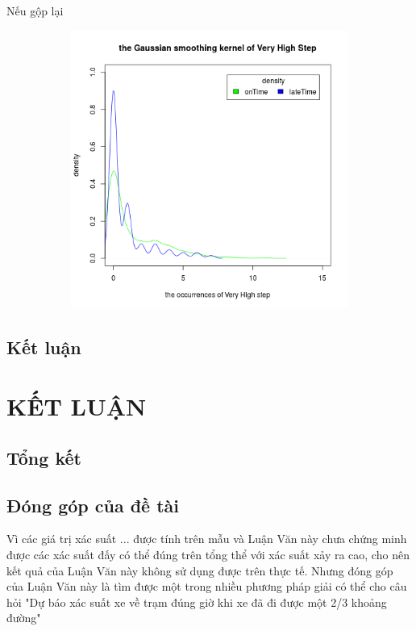 \documentclass[a4paper, 13pt]{report}
\begin{document}
\FloatBarrier
Nếu gộp lại \\
\FloatBarrier
\begin{figure}[h]
    \begin{subfigure}[b]{0.7\textwidth}
        \includegraphics[width=\textwidth]{DensityVeryHighStep.png}
    \end{subfigure}
\end{figure}
\FloatBarrier
\section{Kết luận}
\chapter{KẾT LUẬN}
\section{Tổng kết}
\section{Đóng góp của đề tài}
Vì các giá trị xác suất ... được tính trên mẫu và Luận Văn này chưa chứng minh được các xác suất đấy có thể đúng trên tổng thể với xác suất xảy ra cao, cho nên kết quả của Luận Văn này không sử dụng được trên thực tế. Nhưng đóng góp của Luận Văn này là tìm được một trong nhiều phương pháp giải có thể cho câu hỏi "Dự báo xác suất xe về trạm đúng giờ khi xe đã đi được một 2/3 khoảng đường"
\end{document}
